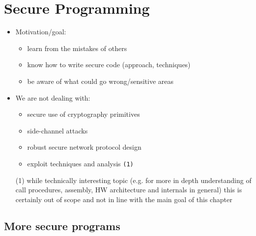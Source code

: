 
\section{Secure Programming}

\begin{itemize}
  \item Motivation/goal:
  \begin{itemize}
    \item learn from the mistakes of others
    \item know how to write secure code (approach, techniques)
    \item be aware of what could go wrong/sensitive areas
  \end{itemize}
  \item We are not dealing with:
  \begin{itemize}
    \item secure use of cryptography primitives
    \item side-channel attacks
    \item robust secure network protocol design
    \item exploit techniques and analysis \texttt{(1)}
  \end{itemize}
\end{itemize}


\begin{itemize}
  \item[(1)] while technically interesting topic (e.g. for more in depth
  understanding of call procedures, assembly, HW architecture and internals
  in general) this is certainly out of scope and not in line with the main
  goal of this chapter
\end{itemize}


\subsection{More secure programs}

